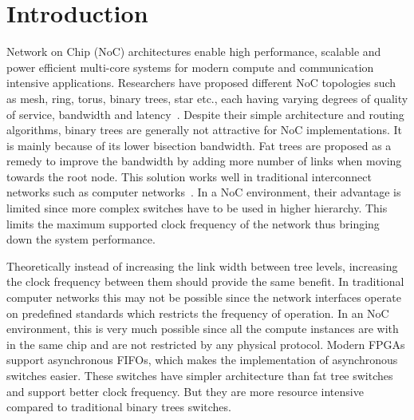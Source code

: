 \section{Introduction}
Network on Chip (NoC) architectures enable high performance, scalable and power efficient multi-core systems for modern compute and communication intensive applications.
Researchers have proposed different NoC topologies such as mesh, ring, torus, binary trees, star etc., each having varying degrees of quality of service, bandwidth and latency~\cite{Dally2003}.
Despite their simple architecture and routing algorithms, binary trees are generally not attractive for NoC implementations.
It is mainly because of its lower bisection bandwidth.
Fat trees are proposed as a remedy to improve the bandwidth by adding more number of links when moving towards the root node.
This solution works well in traditional interconnect networks such as computer networks~\cite{Shainer2011}.
In a NoC environment, their advantage is limited since more complex switches have to be used in higher hierarchy.
This limits the maximum supported clock frequency of the network thus bringing down the system performance. 

Theoretically instead of increasing the link width between tree levels, increasing the clock frequency between them should provide the same benefit.
In traditional computer networks this may not be possible since the network interfaces operate on predefined standards which restricts the frequency of operation.
In an NoC environment, this is very much possible since all the compute instances are with in the same chip and are not restricted by any physical protocol. 
Modern FPGAs support asynchronous FIFOs, which makes the implementation of asynchronous switches easier.
These switches have simpler architecture than fat tree switches and support better clock frequency.
But they are more resource intensive compared to traditional binary trees switches.


